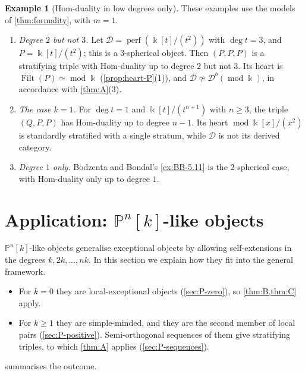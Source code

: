 \documentclass[11pt,reqno]{amsart}
\theoremstyle{plain}
\theoremstyle{definition}
\newtheorem{example}[theorem]{Example}
\theoremstyle{remark}
\newcommand{\kk}{\Bbbk}
\DeclareMathOperator{\Filt}{Filt}
\newcommand{\modd}{\operatorname{mod}}
\newcommand{\Db}{\mathcal{D}^b}
\newcommand{\Pn}[2]{\mathbb{P}^{#1}[#2]}
\newcommand{\cD}{\mathcal{D}}
\begin{document}
\begin{example}[Hom-duality in low degrees only]\label{ex:deg2}
These examples use the models of \cref{thm:formality}, with $m=1$.
\begin{enumerate}
\item \emph{Degree $2$ but not $3$.} Let $\cD=\operatorname{perf}(\kk[t]/(t^2))$ with $\deg t=3$, and $P=\kk[t]/(t^2)$; this is a $3$-spherical object. Then $(P,P,P)$ is a stratifying triple with Hom-duality up to degree $2$ but not $3$. Its heart is $\Filt(P)\simeq\modd\kk$ (\cref{prop:heart-P}(1)), and $\cD\not\simeq\Db(\modd\kk)$, in accordance with \cref{thm:A}(3).
\item \emph{The case $k=1$.} For $\deg t=1$ and $\kk[t]/(t^{n+1})$ with $n\ge3$, the triple $(Q,P,P)$ has Hom-duality up to degree $n-1$. Its heart $\modd\kk[x]/(x^2)$ is standardly stratified with a single stratum, while $\cD$ is not its derived category.
\item \emph{Degree $1$ only.} Bodzenta and Bondal's \cref{ex:BB-5.11} is the $2$-spherical case, with Hom-duality only up to degree $1$.
\end{enumerate}
\end{example}

\section{Application: \texorpdfstring{$\mathbb{P}^n[k]$}{Pn[k]}-like objects}\label{sec:P-objects}

$\Pn nk$-like objects generalise exceptional objects by allowing self-extensions in the degrees $k,2k,\dots,nk$. In this section we explain how they fit into the general framework.
\begin{itemize}
\item For $k=0$ they are local-exceptional objects (\cref{sec:P-zero}), so \cref{thm:B,thm:C} apply.
\item For $k\ge1$ they are simple-minded, and they are the second member of local pairs (\cref{sec:P-positive}). Semi-orthogonal sequences of them give stratifying triples, to which \cref{thm:A} applies (\cref{sec:P-sequences}).
\end{itemize}
 summarises the outcome.
\end{document}
